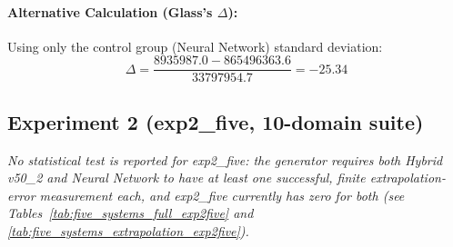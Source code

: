 \paragraph{Alternative Calculation (Glass's $\Delta$):}
Using only the control group (Neural Network) standard deviation:
\begin{equation}
\Delta = \frac{8935987.0 - 865496363.6}{33797954.7} = -25.34
\end{equation}


\subsection*{Experiment 2 (exp2\_five, 10-domain suite)}

\textit{No statistical test is reported for exp2\_five: the generator requires both Hybrid v50\_2 and Neural Network to have at least one successful, finite extrapolation-error measurement each, and exp2\_five currently has zero for both (see Tables~\ref{tab:five_systems_full_exp2five} and \ref{tab:five_systems_extrapolation_exp2five}).}
